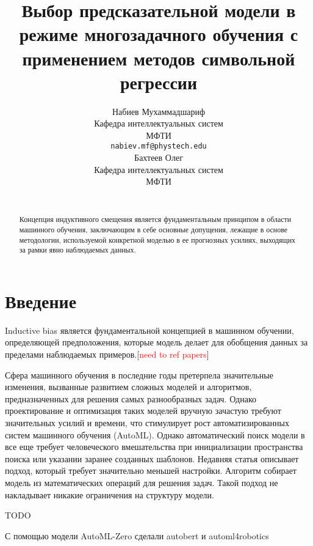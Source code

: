 \documentclass{article}
\title{Выбор предсказательной модели в режиме
многозадачного обучения с применением методов
символьной регрессии}
\author{
    Набиев Мухаммадшариф \\
    Кафедра интеллектуальных систем\\
    МФТИ\\
    \texttt{nabiev.mf@phystech.edu} \\
    \And
    Бахтеев Олег \\
    Кафедра интеллектуальных систем\\
    МФТИ\\
    \texttt{} \\
}
\date{}
\begin{document}
\maketitle

\begin{abstract}
Концепция индуктивного смещения является фундаментальным принципом в области машинного обучения, заключающим в себе основные допущения, лежащие в основе методологии, используемой конкретной моделью в ее прогнозных усилиях, выходящих за рамки явно наблюдаемых данных.

\end{abstract}


\section{Введение} 
Inductive bias является фундаментальной концепцией в машинном обучении, определяющей предположения, которые модель делает для обобщения данных за пределами наблюдаемых примеров.[\textcolor{red}{need to ref papers}] 


Сфера машинного обучения в последние годы претерпела значительные изменения, вызванные развитием сложных моделей и алгоритмов, предназначенных для решения самых разнообразных задач. Однако проектирование и оптимизация таких моделей вручную зачастую требуют значительных усилий и времени, что стимулирует рост автоматизированных систем машинного обучения (AutoML). Однако автоматический поиск модели в все еще требует человеческого вмешательства при инициализации пространства поиска или указании заранее созданных шаблонов. Недавняя статья\citep{automl-zero} описывает подход, который требует значительно меньшей настройки. Алгоритм собирает модель из математических операций для решения задач. Такой подход не накладывает никакие ограничения на структуру модели.

TODO

С помощью модели AutoML-Zero сделали autobert\citep{autobert} и automl4robotics\citep{automl4robots}
    
\end{document}
